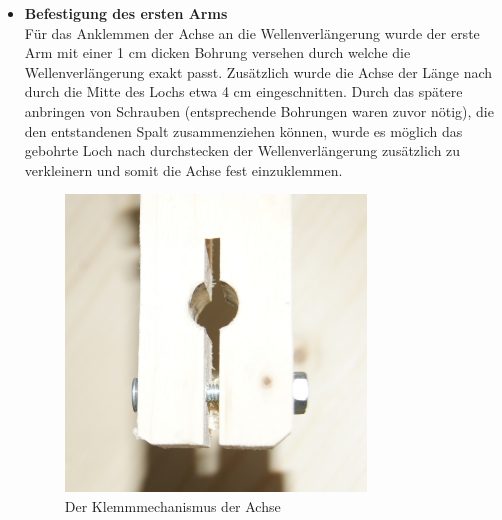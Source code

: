\begin{itemize}
\item \textbf{Befestigung des ersten Arms}\\
Für das Anklemmen der Achse an die Wellenverlängerung wurde der erste Arm mit einer 1 cm dicken Bohrung versehen durch welche die Wellenverlängerung exakt passt. Zusätzlich wurde die Achse der Länge nach durch die Mitte des Lochs etwa 4 cm eingeschnitten. Durch das spätere anbringen von Schrauben (entsprechende Bohrungen waren zuvor nötig), die den entstandenen Spalt zusammenziehen können, wurde es möglich das gebohrte Loch nach durchstecken der Wellenverlängerung zusätzlich zu verkleinern und somit die Achse fest einzuklemmen.
\begin{figure}[H]
\centering
\includegraphics[width=8cm]{images/axis_fix}
\caption{Der Klemmmechanismus der Achse}
\end{figure}


\end{itemize}

